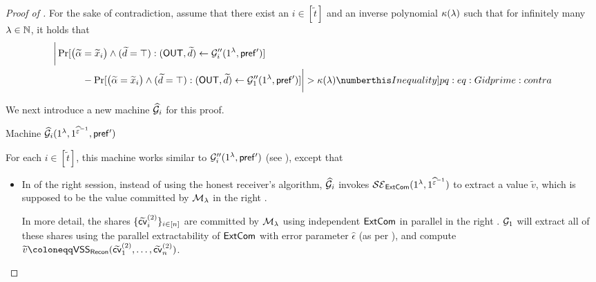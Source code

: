 \begin{proof}[Proof of ]
    
    For the sake of contradiction, assume that there exist an $i \in [\tilde{t}]$ and an inverse polynomial $\kappa(\lambda)$ such that for infinitely many $\lambda\in \mathbb{N}$, it holds that 
    \begin{align*}
        & \bigg|  \Pr[\big( \tilde{\alpha} = \tilde{x}_i \big)\wedge (\tilde{d} = \top): (\OUT,\tilde{d}) \gets \mcal{G}_i''(1^\secpar,\msf{pref'})] \\
         &\hspace{3em} - \Pr[\big( \tilde{\alpha} = \tilde{x}_i \big)\wedge (\tilde{d} = \top): (\OUT,\tilde{d}) \gets \mcal{G}_1''(1^\secpar,\msf{pref'})] \bigg| 
         > \kappa(\secpar) \numberthis \label[Inequality]{pq:eq:Gidprime:contra}
    \end{align*} 

    We next introduce a new machine $\mathcal{\widehat{G}}_i$ for this proof. 
\begin{AlgorithmBox}[label={algo:G:hat}]{Machine \textnormal{$\mathcal{\widehat{G}}_i(1^\lambda, 1^{\widehat{\varepsilon}^{-1}},\mathsf{pref'})$}}

     For each $i \in [\tilde{t}]$, this machine works similar to $\mathcal{G}_i''(1^\lambda, \mathsf{pref'})$ (see ), except that
    \begin{itemize}
    \item
    In  of the right session, instead of using the honest receiver's algorithm,  $\mathcal{\widehat{G}}_i$ invokes $\mathcal{SE}_\mathsf{ExtCom}(1^\lambda, 1^{\widehat{\varepsilon}^{-1}})$ to extract a value $\tilde{v}$, which is supposed to be the value committed by $\mathcal{M}_\lambda$ in the right .

    In more detail, the shares $\{\widetilde{\mathsf{cv}}^{(2)}_i\}_{i \in [n]}$ are committed by $\mathcal{M}_\lambda$ using independent $\mathsf{ExtCom}$ in parallel in the right . $\mathcal{G}_1$ will extract all of these shares using the parallel extractability of $\mathsf{ExtCom}$ with error parameter $\hat{\epsilon}$ (as per ), and compute $\tilde{v} \coloneqq \VSS_{\Recon}(\tilde{\msf{cv}}^{(2)}_1, \ldots, \tilde{\msf{cv}}^{(2)}_n)$.

    \end{itemize} 
\end{AlgorithmBox}
  

\end{proof}
